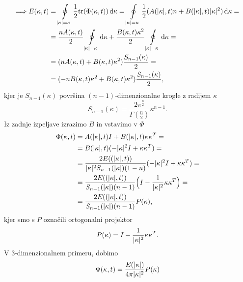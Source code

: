 \documentclass[mat2, tisk]{fmfdelo}
\newcommand{\bd}{\textbf}
\begin{document}
\begin{align*}
  \Longrightarrow E(\kappa, t) &= \oint\limits_{|\text{\bd{$\kappa$}}| = \kappa} \frac{1}{2} \text{tr}(\Phi(\text{\bd{$\kappa$}}, t)) \dif \text{\bd{$\kappa$}} = \oint\limits_{|\text{\bd{$\kappa$}}| = \kappa} \frac{1}{2} (A(|\text{\bd{$\kappa$}}|, t) n + B(|\text{\bd{$\kappa$}}|, t) |\text{\bd{$\kappa$}}|^2) \dif \text{\bd{$\kappa$}} = \\
&= \frac{n A(\kappa, t)}{2} \oint\limits_{|\text{\bd{$\kappa$}}| = \kappa} \dif \text{\bd{$\kappa$}} + \frac{B(\kappa, t) \kappa^2}{2} \oint\limits_{|\text{\bd{$\kappa$}}| = \kappa} \dif \text{\bd{$\kappa$}} = \\
&= ({n A(\kappa, t)} + {B(\kappa, t) \kappa^2}) \frac{S_{n-1}(\kappa)}{2} = \\
&= ({- n B(\kappa, t)}\kappa^2 + {B(\kappa, t) \kappa^2}) \frac{S_{n-1}(\kappa)}{2},
\end{align*}
kjer je $S_{n-1}(\kappa)$ površina $(n-1)$-dimenzionalne krogle z radijem
$\kappa$ 
$$
S_{n-1}(\kappa) = \frac{2\pi^{\frac{n}{2}}}{\Gamma(\frac{n}{2})} \kappa^{n-1}.
$$
Iz zadnje izpeljave izrazimo $B$ in vstavimo v $\Phi$
\begin{align}
  \Phi(\text{\bd{$\kappa$}}, t) &= A(|\text{\bd{$\kappa$}}|, t) I + B(|\text{\bd{$\kappa$}}|, t) \text{\bd{$\kappa$}} \text{\bd{$\kappa$}}^T = \nonumber\\
  &= B(|\text{\bd{$\kappa$}}|, t) (-|\text{\bd{$\kappa$}}|^2 I + \text{\bd{$\kappa$}} \text{\bd{$\kappa$}}^T) = \nonumber\\
  &= \frac{2E((|\text{\bd{$\kappa$}}|, t))}{|\text{\bd{$\kappa$}}|^2 S_{n-1}(|\text{\bd{$\kappa$}}|)(1-n)} (-|\text{\bd{$\kappa$}}|^2 I + \text{\bd{$\kappa$}} \text{\bd{$\kappa$}}^T) = \nonumber\\
  &= \frac{2E((|\text{\bd{$\kappa$}}|, t))}{S_{n-1}(|\text{\bd{$\kappa$}}|)(n-1)} \Big(I - \frac{1}{|\text{\bd{$\kappa$}}|^2}\text{\bd{$\kappa$}} \text{\bd{$\kappa$}}^T\Big) = \nonumber\\
  &= \frac{2E((|\text{\bd{$\kappa$}}|, t))}{S_{n-1}(|\text{\bd{$\kappa$}}|)(n-1)} P(\text{\bd{$\kappa$}}),
\label{hitrostno_spektralni_tenzor_izotropija}
\end{align}
kjer smo s $P$ označili ortogonalni projektor 
$$
P(\text{\bd{$\kappa$}}) = I - \frac{1}{|\text{\bd{$\kappa$}}|^2}\text{\bd{$\kappa$}} \text{\bd{$\kappa$}}^T.
$$
V $3$-dimenzionalnem primeru, dobimo 
\begin{equation}
\Phi(\text{\bd{$\kappa$}}, t) = \frac{E(|\text{\bd{$\kappa$}}|)}{4\pi |\text{\bd{$\kappa$}}|^2}P(\text{\bd{$\kappa$}})
\end{equation}
\end{document}
